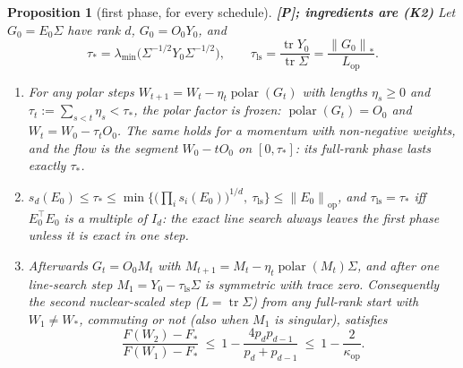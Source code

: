 \documentclass[11pt]{article}
\newtheorem{proposition}[theorem]{Proposition}
\theoremstyle{definition}
\theoremstyle{remark}
\newcommand{\nop}[1]{\left\|#1\right\|_{\mathrm{op}}}
\newcommand{\nnuc}[1]{\left\|#1\right\|_{*}}
\newcommand{\tr}{\operatorname{tr}}
\newcommand{\polar}{\operatorname{polar}}
\newcommand{\Lop}{L_{\mathrm{op}}}
\newcommand{\kop}{\kappa_{\mathrm{op}}}
\newcommand{\lmin}{\lambda_{\min}}
\begin{document}
\begin{proposition}[first phase, for every schedule]\label{prop:phase1} \textbf{[P]; ingredients are (K2)}
Let $G_0=E_0\Sigma$ have rank $d$, $G_0=O_0Y_0$, and
\[
\tau_\ast=\lmin\big(\Sigma^{-1/2}Y_0\Sigma^{-1/2}\big),\qquad \tau_{\mathrm{ls}}=\frac{\tr Y_0}{\tr\Sigma}=\frac{\nnuc{G_0}}{\Lop}.
\]
\begin{enumerate}[label=(\alph*)]
\item For any polar steps $W_{t+1}=W_t-\eta_t\polar(G_t)$ with lengths $\eta_s\ge0$ and $\tau_t:=\sum_{s<t}\eta_s<\tau_\ast$,
the polar factor is frozen: $\polar(G_t)=O_0$ and $W_t=W_0-\tau_tO_0$. The same holds for a momentum with non-negative
weights, and the flow is the segment $W_0-tO_0$ on $[0,\tau_\ast]$: its full-rank phase lasts exactly $\tau_\ast$.
\item $s_d(E_0)\le\tau_\ast\le\min\big\{\big(\prod_is_i(E_0)\big)^{1/d},\ \tau_{\mathrm{ls}}\big\}\le\nop{E_0}$, and
$\tau_{\mathrm{ls}}=\tau_\ast$ iff $E_0^\top E_0$ is a multiple of $I_d$: the exact line search always leaves the first
phase unless it is exact in one step.
\item Afterwards $G_t=O_0M_t$ with $M_{t+1}=M_t-\eta_t\polar(M_t)\Sigma$, and after one line-search step
$M_1=Y_0-\tau_{\mathrm{ls}}\Sigma$ is symmetric with trace zero. Consequently the \emph{second} nuclear-scaled step
($L=\tr\Sigma$) from any full-rank start with $W_1\ne W_\ast$, commuting or not (also when $M_1$ is singular), satisfies
\[
\frac{F(W_2)-F_\ast}{F(W_1)-F_\ast}\ \le\ 1-\frac{4p_dp_{d-1}}{p_d+p_{d-1}}\ \le\ 1-\frac2{\kop}.
\]
\end{enumerate}
\end{proposition}
\end{document}
